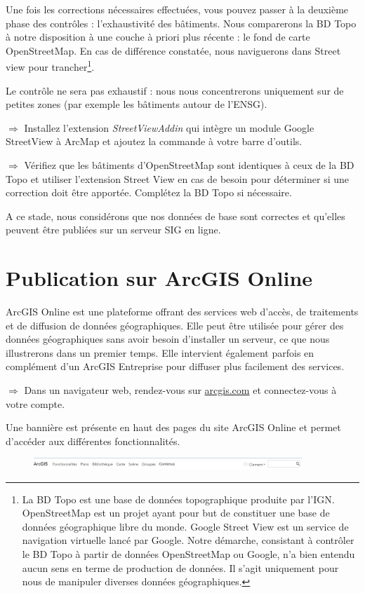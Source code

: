 \documentclass[11pt]{article}
\newcommand{\action}{$\Rightarrow$ }
\begin{document}
Une fois les corrections nécessaires effectuées, vous pouvez passer à la deuxième phase des contrôles : l'exhaustivité des bâtiments. Nous comparerons la BD Topo à notre disposition à une couche à priori plus récente : le fond de carte OpenStreetMap. En cas de différence constatée, nous naviguerons dans Street view pour trancher\footnote{La BD Topo est une base de données topographique produite par l'IGN. OpenStreetMap est un projet ayant pour but de constituer une base de données géographique libre du monde. Google Street View est un service de navigation virtuelle lancé par Google. Notre démarche, consistant à contrôler le BD Topo à partir de données OpenStreetMap ou Google, n'a bien entendu aucun sens en terme de production de données. Il s'agit uniquement pour nous de manipuler diverses données géographiques.}.

Le contrôle ne sera pas exhaustif : nous nous concentrerons uniquement sur de petites zones (par exemple les bâtiments autour de l'ENSG).

\action Installez l'extension \textit{StreetViewAddin} qui intègre un module Google StreetView à ArcMap et ajoutez la commande à votre barre d'outils.

\action Vérifiez que les bâtiments d'OpenStreetMap sont identiques à ceux de la BD Topo et utiliser l'extension Street View en cas de besoin pour déterminer si une correction doit être apportée. Complétez la BD Topo si nécessaire.

A ce stade, nous considérons que nos données de base sont correctes et qu'elles peuvent être publiées sur un serveur SIG en ligne. 



\section{Publication sur ArcGIS Online}

ArcGIS Online est une plateforme offrant des services web d'accès, de traitements et de diffusion de données géographiques. Elle peut être utilisée pour gérer des données géographiques sans avoir besoin d'installer un serveur, ce que nous illustrerons dans un premier temps. Elle intervient également parfois en complément d'un ArcGIS Entreprise pour diffuser plus facilement des services.

\action Dans un navigateur web, rendez-vous sur \url{arcgis.com} et connectez-vous à votre compte.

Une bannière est présente en haut des pages du site ArcGIS Online et permet d'accéder aux différentes fonctionnalités.
\begin{figure}[H]
	\center \includegraphics[width=0.9\textwidth]{img/td1/ago_banniere.jpg} \\
\end{figure}
\end{document}

